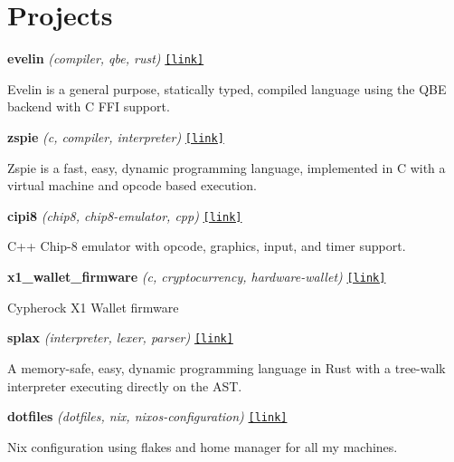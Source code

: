 \documentclass[a4paper,11pt]{article}
\begin{document}
\section*{Projects}
\noindent\textbf{evelin} \textit{\footnotesize (compiler, qbe, rust) } \hfill \texttt{\href{https://github.com/prashantrahul141/evelin}{[link]}} \\ 
\parbox{0.88\textwidth}{Evelin is a general purpose, statically typed, compiled language using the QBE backend with C FFI support.}  \vspace{0.8em} 

\noindent\textbf{zspie} \textit{\footnotesize (c, compiler, interpreter) } \hfill \texttt{\href{https://github.com/prashantrahul141/zspie}{[link]}} \\ 
\parbox{0.88\textwidth}{Zspie is a fast, easy, dynamic programming language, implemented in C with a virtual machine and opcode based execution.}  \vspace{0.8em} 

\noindent\textbf{cipi8} \textit{\footnotesize (chip8, chip8-emulator, cpp) } \hfill \texttt{\href{https://github.com/prashantrahul141/cipi8}{[link]}} \\ 
\parbox{0.88\textwidth}{C++ Chip-8 emulator with opcode, graphics, input, and timer support.}  \vspace{0.8em} 

\noindent\textbf{x1\_wallet\_firmware} \textit{\footnotesize (c, cryptocurrency, hardware-wallet) } \hfill \texttt{\href{https://github.com/Cypherock/x1\_wallet\_firmware}{[link]}} \\ 
\parbox{0.88\textwidth}{Cypherock X1 Wallet firmware}  \vspace{0.8em} 

\noindent\textbf{splax} \textit{\footnotesize (interpreter, lexer, parser) } \hfill \texttt{\href{https://github.com/prashantrahul141/splax}{[link]}} \\ 
\parbox{0.88\textwidth}{A memory-safe, easy, dynamic programming language in Rust with a tree-walk interpreter executing directly on the AST.}  \vspace{0.8em} 

\noindent\textbf{dotfiles} \textit{\footnotesize (dotfiles, nix, nixos-configuration) } \hfill \texttt{\href{https://github.com/prashantrahul141/dotfiles}{[link]}} \\ 
\parbox{0.88\textwidth}{Nix configuration using flakes and home manager for all my machines.}  \vspace{0.8em} 
\end{document}
